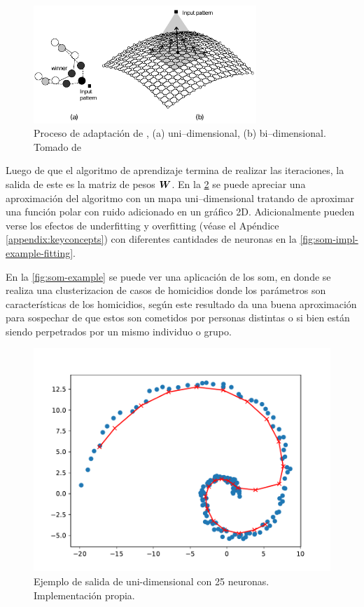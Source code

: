 \begin{figure}[H]
  \centering
  \includegraphics[width=0.75\textwidth]{Figures/som-adaptive-proc.pdf}
  \decoRule
  \caption[Proceso de adaptación de ]{Proceso de adaptación de , (a) uni--dimensional, (b) bi--dimensional. Tomado de \cite{de2006fundamentals}}
  \label{fig:som-adap-proc}
\end{figure}

Luego de que el algoritmo de aprendizaje termina de realizar las iteraciones, la salida de este es la matriz de pesos ${\bm{W}}$. En la \cref{fig:som-impl-example} se puede apreciar una aproximación del algoritmo con un mapa uni--dimensional tratando de aproximar una función polar con ruido adicionado en un gráfico 2D. Adicionalmente pueden verse los efectos de \gls{underfitting} y \gls{overfitting} (véase el Apéndice \ref{appendix:keyconcepts}) con diferentes cantidades de neuronas en la \cref{fig:som-impl-example-fitting}.

En la \cref{fig:som-example} se puede ver una aplicación de los \gls{som}, en donde se realiza una clusterizacion de casos de homicidios donde los parámetros son características de los homicidios, según \cite{mena2003investigative} este resultado da una buena aproximación para sospechar de que estos son cometidos por personas distintas o si bien están siendo perpetrados por un mismo individuo o grupo.

\begin{figure}[H]
\centering
\includegraphics[width=\textwidth]{Figures/som-implementation-example25.pdf}
\decoRule
\caption[Ejemplo de salida de  uni-dimensional]{Ejemplo de salida de  uni-dimensional con 25 neuronas. Implementación propia.}
\label{fig:som-impl-example}
\end{figure}

